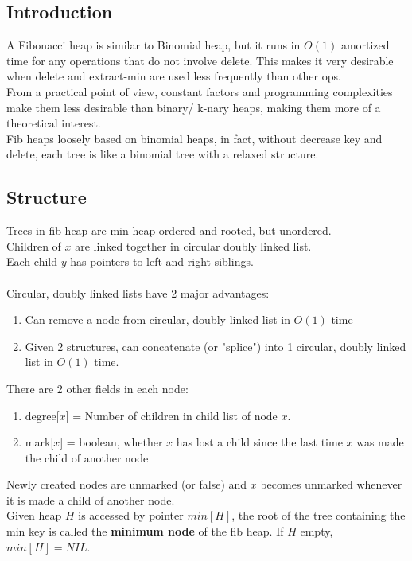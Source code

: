 \documentclass{article}
\begin{document}
\subsection{Introduction}
A Fibonacci heap is similar to Binomial heap, but it runs in $O(1)$ amortized time for any operations that do not involve delete. This makes it very desirable when delete and extract-min are used less frequently than other ops.\\
From a practical point of view, constant factors and programming complexities make them less desirable than binary/ k-nary heaps, making them more of a theoretical interest.\\
Fib heaps loosely based on binomial heaps, in fact, without decrease key and delete, each tree is like a binomial tree with a relaxed structure.\\
\subsection{Structure}
Trees in fib heap are min-heap-ordered and rooted, but unordered.\\
Children of $x$ are linked together in circular doubly linked list.\\
Each child $y$ has pointers to left and right siblings.\\
\\
Circular, doubly linked lists have 2 major advantages:
\begin{enumerate}
    \item Can remove a node from circular, doubly linked list in $O(1)$ time
    \item Given 2 structures, can concatenate (or "splice") into 1 circular, doubly linked list in $O(1)$ time.
\end{enumerate}
There are 2 other fields in each node:
\begin{enumerate}
    \item degree[$x$] = Number of children in child list of node $x$.
    \item mark[$x$] = boolean, whether $x$ has lost a child since the last time $x$ was made the child of another node
\end{enumerate}
Newly created nodes are unmarked (or false) and $x$ becomes unmarked whenever it is made a child of another node.\\
Given heap $H$ is accessed by pointer $min[H]$, the root of the tree containing the min key is called the \textbf{minimum node} of the fib heap. If $H$ empty, $min[H] = NIL$.\\
\end{document}
